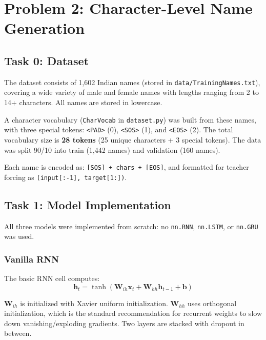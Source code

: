 \documentclass[11pt, a4paper]{article}
\begin{document}
\section{Problem 2: Character-Level Name Generation}

\subsection{Task 0: Dataset}

The dataset consists of 1,602 Indian names (stored in \texttt{data/TrainingNames.txt}), covering a wide variety of male and female names with lengths ranging from 2 to 14+ characters. All names are stored in lowercase.

A character vocabulary (\texttt{CharVocab} in \texttt{dataset.py}) was built from these names, with three special tokens: \texttt{<PAD>} (0), \texttt{<SOS>} (1), and \texttt{<EOS>} (2). The total vocabulary size is \textbf{28 tokens} (25 unique characters + 3 special tokens). The data was split 90/10 into train (1,442 names) and validation (160 names).

Each name is encoded as: \texttt{[SOS] + chars + [EOS]}, and formatted for teacher forcing as \texttt{(input[:-1], target[1:])}.

\subsection{Task 1: Model Implementation}

All three models were implemented from scratch: no \texttt{nn.RNN}, \texttt{nn.LSTM}, or \texttt{nn.GRU} was used.

\subsubsection{Vanilla RNN}

The basic RNN cell computes:
\begin{equation}
\mathbf{h}_t = \tanh\left(\mathbf{W}_{ih} \mathbf{x}_t + \mathbf{W}_{hh} \mathbf{h}_{t-1} + \mathbf{b}\right)
\end{equation}

$\mathbf{W}_{ih}$ is initialized with Xavier uniform initialization. $\mathbf{W}_{hh}$ uses orthogonal initialization, which is the standard recommendation for recurrent weights to slow down vanishing/exploding gradients. Two layers are stacked with dropout in between.
\end{document}
